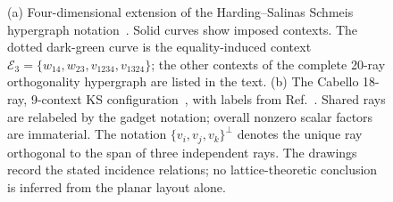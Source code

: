\documentclass[%
  reprint,
  superscriptaddress,
  showpacs,
  showkeys,
  amsmath,amssymb,
  pra,
  longbibliography,
  floatfix,
  x11names
]{revtex4-2}
\newcommand{\rev}[1]{{\color{revisionblue}#1}}
\begin{document}
\begin{figure}[ht]
\begin{tabular}{ccc}

\end{tabular}
\caption{
\rev{(a) Four-dimensional extension of the Harding--Salinas Schmeis hypergraph notation~\cite{harding2025remarksIJTP}.  Solid curves show imposed contexts.  The dotted dark-green curve is the equality-induced context $\mathcal{E}_3=\{w_{14},w_{23},v_{1234},v_{1324}\}$; the other contexts of the complete 20-ray orthogonality hypergraph are listed in the text.  (b) The Cabello 18-ray, 9-context KS configuration~\cite{cabello-96}, with labels from Ref.~\cite{cabello:210401}.  Shared rays are relabeled by the gadget notation; overall nonzero scalar factors are immaterial.  The notation $\{v_i,v_j,v_k\}^{\perp}$ denotes the unique ray orthogonal to the span of three independent rays.  The drawings record the stated incidence relations; no lattice-theoretic conclusion is inferred from the planar layout alone.}
}
\label{fig:peres}
\end{figure}
\end{document}
